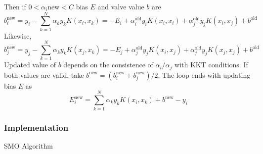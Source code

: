 \documentclass[12pt]{article}
\newcommand{\new}{\text{new}}
\newcommand{\old}{\text{old}}
\begin{document}
Then if $0 < \alpha_i{\new} < C$ bias $E$ and valve value $b$ are
\begin{equation}
    b_i^{\new} = y_i - \sum_{k=1}^N \alpha_k y_k K(x_i,x_k) = -E_i + \alpha_i^{\old}y_iK(x_i, x_i) + \alpha_j^{\old}y_j K(x_i, x_j) + b^{\old}
\end{equation}
Likewise,
\begin{equation}
    b_j^{\new} = y_j - \sum_{k=1}^N \alpha_k y_k K(x_j,x_k) = -E_j + \alpha_j^{\old}y_jK(x_i, x_j) + \alpha_j^{\old}y_j K(x_j, x_j) + b^{\old}
\end{equation}
Updated value of $b$ depends on the consistence of $\alpha_i/\alpha_j$ with KKT conditions. If both values are valid, take $b^{\new} = (b_i^{\new} + b_j^{\new}) / 2$. The loop ends with updating bias $E$ as 
\begin{equation}
    E_i^{\new} = \sum_{k=1}^N \alpha_ky_kK(x_i,x_k) + b^{\new} - y_i
\end{equation}
\subsubsection{Implementation}
\begin{algorithm}
    \label{SMO}
    \caption{SMO Algorithm}
    \begin{algorithmic}
        \ENDWHILE
    \end{algorithmic}
\end{algorithm}
\end{document}
